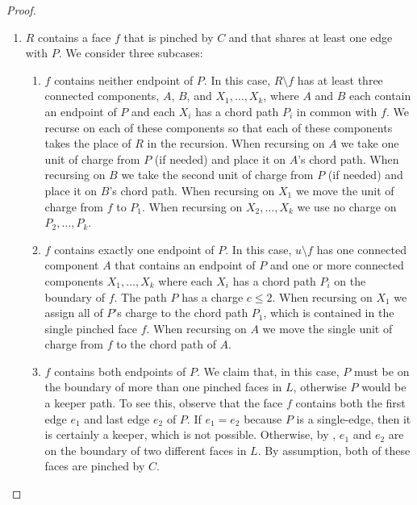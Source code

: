 \documentclass[a4paper,UKenglish]{socg-lipics-v2019}
\begin{document}
\begin{proof}
\begin{enumerate}
     \item $R$ contains a face $f$ that is pinched by $C$ and that shares
     at least one edge with $P$.  We consider three subcases:
     \begin{enumerate}
	\item $f$ contains neither endpoint of $P$. In this case,
	$R\setminus f$ has at least three connected components, $A$, $B$,
	and $X_1,\ldots,X_k$, where $A$ and $B$ each contain an endpoint
	of $P$ and each $X_i$ has a chord path $P_i$ in common
	with $f$.  We recurse on each of these components so that each
	of these components takes the place of $R$ in the recursion. When
	recursing on $A$ we take one unit of charge from $P$ (if needed)
	and place it on $A$'s chord path.  When recursing on $B$ we take
	the second unit of charge from $P$ (if needed) and place it on
	$B$'s chord path.  When recursing on $X_1$ we move the unit of
	charge from $f$ to $P_1$.  When recursing on $X_2,\ldots,X_k$
	we use no charge on $P_2,\ldots,P_k$.

	\item $f$ contains exactly one endpoint of $P$.  In this case,
	$u\setminus f$ has one connected component $A$ that contains
	an endpoint of $P$ and one or more connected components
	$X_1,\ldots,X_k$ where each $X_i$ has a chord path $P_i$ on the
	boundary of $f$.
	The path $P$ has a charge $c\le 2$.  When recursing on $X_1$
	we assign all of $P$'s charge to the chord path $P_1$, which is
	contained in the single pinched face $f$.
	When recursing on $A$ we move the single unit of charge from $f$
	to the chord path of $A$.

        \item $f$ contains both endpoints of $P$.  We claim that,
        in this case, $P$ must be on the boundary of more than one
        pinched faces in $L$, otherwise $P$ would be a keeper path.
        To see this, observe that the face $f$ contains both the first
        edge $e_1$ and last edge $e_2$ of $P$. If $e_1=e_2$ because $P$
        is a single-edge, then it is certainly a keeper, which is not
        possible. Otherwise, by
        , $e_1$ and $e_2$ are on the boundary of
        two different faces in $L$.  By assumption, both of these faces
        are pinched by $C$.


\end{enumerate}
\end{enumerate}
\end{proof}
\end{document}
